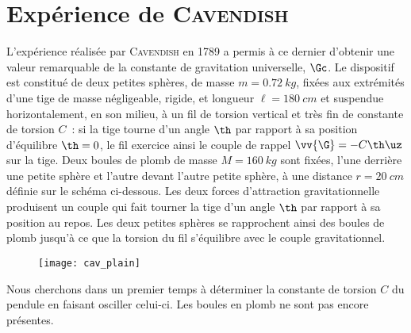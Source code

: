\documentclass[a4paper, 10pt, final, garamond]{book}
\begin{document}
\section{Expérience de \textsc{Cavendish}}
L'expérience réalisée par \textsc{Cavendish} en 1789 a permis à ce dernier
d'obtenir une valeur remarquable de la constante de gravitation universelle,
$\Gc$. Le dispositif est constitué de deux petites sphères, de masse $m =
	\SI{0.72}{kg}$, fixées aux extrémités d'une tige de masse négligeable, rigide,
et longueur $\ell = \SI{180}{cm}$ et suspendue horizontalement, en son milieu, à
un fil de torsion vertical et très fin de constante de torsion $C$~: si la tige
tourne d'un angle $\th$ par rapport à sa position d'équilibre $\th = 0$, le fil
exercice ainsi le couple de rappel $\vv{\G} = -C\th \uz$ sur la tige.
\smallbreak
Deux boules de plomb de masse $M = \SI{160}{kg}$ sont fixées, l'une derrière une
petite sphère et l'autre devant l'autre petite sphère, à une distance $r =
	\SI{20}{cm}$ définie sur le schéma ci-dessous. Les deux forces d'attraction
gravitationnelle produisent un couple qui fait tourner la tige d'un angle $\th$
par rapport à sa position au repos. Les deux petites sphères se rapprochent
ainsi des boules de plomb jusqu'à ce que la torsion du fil s'équilibre avec le
couple gravitationnel.
\begin{figure}[htbp!]
	\centering
	\texttt{[image: cav\_plain]}
\end{figure}
\begin{blocQR}
	\item Nous cherchons dans un premier temps à déterminer la constante de
	torsion $C$ du pendule en faisant osciller celui-ci. Les boules en plomb ne
	sont pas encore présentes.
\end{blocQR}
\end{document}
